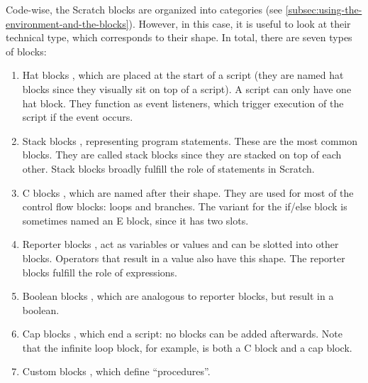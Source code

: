 \documentclass[../main]{subfiles}
\begin{document}
Code-wise, the Scratch blocks are organized into categories (see \cref{subsec:using-the-environment-and-the-blocks}).
However, in this case, it is useful to look at their technical type, which corresponds to their shape.
In total, there are seven types of blocks:

\begin{enumerate}[noitemsep]
    \item Hat blocks \scratchinline{\blockinit{\hspace{1em}\dots\hspace*{1em}}}, which are placed at the start of a script (they are named hat blocks since they visually sit on top of a script).
        A script can only have one hat block.
        They function as event listeners, which trigger execution of the script if the event occurs.
    \item Stack blocks \scratchinline{\blockmove{\hspace{1em}\dots\hspace*{0.5cm}}}, representing program statements.
        These are the most common blocks.
        They are called stack blocks since they are stacked on top of each other.
        Stack blocks broadly fulfill the role of statements in Scratch.
    \item C blocks \scratchinline{\blockif{\hspace{1em}\dots\hspace*{1em}}{\blockspace[0.2]}}, which are named after their shape.
        They are used for most of the control flow blocks: loops and branches.
        The variant for the if/else block is sometimes named an E block, since it has two slots.
    \item Reporter blocks \ovalmove{\hspace{1em}\dots\hspace*{1em}}, act as variables or values and can be slotted into other blocks.
        Operators that result in a value also have this shape.
        The reporter blocks fulfill the role of expressions.
    \item Boolean blocks \boolsensing{\hspace{1em}\dots\hspace*{1em}}, which are analogous to reporter blocks, but result in a boolean.
    \item Cap blocks \scratchinline{\blockstop{\hspace{1em}\dots\hspace*{1em}}}, which end a script: no blocks can be added afterwards.
        Note that the infinite loop block, for example, is both a C block and a cap block.
    \item Custom blocks , which define ``procedures''.
\end{enumerate}
\end{document}
